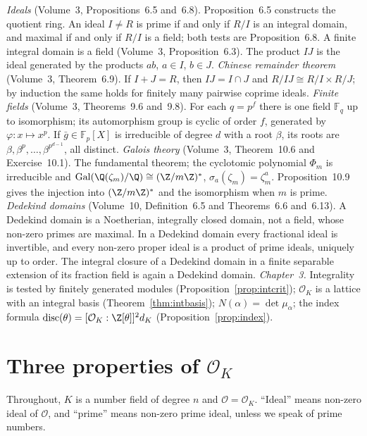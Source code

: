 \begin{reminder}
\emph{Ideals} (Volume~3, Propositions~6.5 and~6.8). Proposition~6.5 constructs the quotient ring. An ideal $I\ne R$ is
prime if and only if $R/I$ is an integral domain, and maximal if and only if $R/I$ is a field; both tests are
Proposition~6.8. A finite integral domain is a field (Volume~3, Proposition~6.3). The product $IJ$ is the ideal generated by the products $ab$, $a\in I$, $b\in J$.
\emph{Chinese remainder theorem} (Volume~3, Theorem~6.9). If $I+J=R$, then $IJ=I\cap J$ and $R/IJ\cong R/I\times R/J$; by
induction the same holds for finitely many pairwise coprime ideals.
\emph{Finite fields} (Volume~3, Theorems~9.6 and~9.8). For each $q=p^f$ there is one field $\mathbb F_q$ up to isomorphism;
its automorphism group is cyclic of order $f$, generated by $\varphi:x\mapsto x^p$. If $\bar g\in\mathbb F_p[X]$ is
irreducible of degree $d$ with a root $\beta$, its roots are $\beta,\beta^p,\dots,\beta^{p^{d-1}}$, all distinct.
\emph{Galois theory} (Volume~3, Theorem~10.6 and Exercise~10.1). The fundamental theorem; the cyclotomic
polynomial $\Phi_m$ is irreducible and $\operatorname{Gal}(\Q(\zeta_m)/\Q)\cong(\Z/m\Z)^*$, $\sigma_a(\zeta_m)=\zeta_m^a$. Proposition~10.9 gives the injection into $(\Z/m\Z)^*$ and the isomorphism when $m$ is prime.
\emph{Dedekind domains} (Volume~10, Definition~6.5 and Theorems~6.6 and~6.13). A Dedekind domain is a Noetherian,
integrally closed domain, not a field, whose non-zero primes are maximal. In a Dedekind domain every fractional ideal is
invertible, and every non-zero proper ideal is a product of prime ideals, uniquely up to order. The integral closure of a
Dedekind domain in a finite separable extension of its fraction field is again a Dedekind domain.
\emph{Chapter~3.} Integrality is tested by finitely generated modules (Proposition~\ref{prop:intcrit}); $\mathcal O_K$
is a lattice with an integral basis (Theorem~\ref{thm:intbasis}); $N(\alpha)=\det\mu_\alpha$; the index formula
$\operatorname{disc}(\theta)=[\mathcal O_K:\Z[\theta]]^2d_K$ (Proposition~\ref{prop:index}).
\end{reminder}

\section{Three properties of $\mathcal O_K$}

Throughout, $K$ is a number field of degree $n$ and $\mathcal O=\mathcal O_K$. ``Ideal'' means non-zero ideal of
$\mathcal O$, and ``prime'' means non-zero prime ideal, unless we speak of prime numbers.

